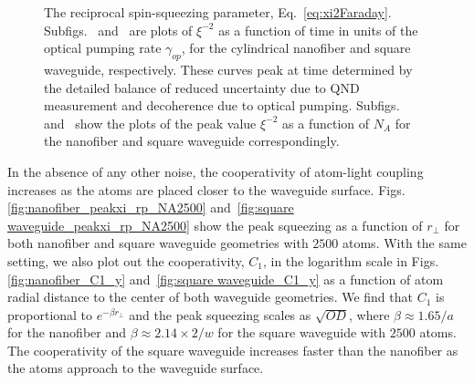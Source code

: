 \documentclass[preprint,aps,pra,onecolumn,superscriptaddress]{revtex4-1} %
\newcommand{\SWG}{square waveguide\xspace}%
\begin{document}
\begin{figure}[htb]
\centering
 \begin{minipage}[h]{0.95\linewidth}
    \hfill
   \end{minipage}\vfill
   \begin{minipage}[h]{0.95\linewidth}
       \hfill
   \end{minipage}
\caption{ The reciprocal spin-squeezing parameter, Eq.~\eqref{eq:xi2Faraday}.  Subfigs.~\protect{} and~\protect{} are plots of $ \xi^{-2} $  as a function of time in units of the optical pumping rate $\gamma_{op}$, for the cylindrical nanofiber and square waveguide, respectively. These curves peak at time determined by the detailed balance of reduced uncertainty due to QND measurement and decoherence due to optical pumping.  Subfigs.~\protect{} and~\protect{} show the plots of the peak value $ \xi^{-2} $ as a function of $ N_A $ for the nanofiber and square waveguide correspondingly. }\label{fig:xi_rpfix_NA_t}
\end{figure}

In the absence of any other noise, the cooperativity of atom-light coupling increases as the atoms are placed closer to the waveguide surface. Figs.\ref{fig:nanofiber_peakxi_rp_NA2500} and~\ref{fig:square waveguide_peakxi_rp_NA2500} show the peak squeezing  as a function of $ r\!_\perp $ for both nanofiber and square waveguide geometries with $2500$ atoms. With the same setting, we also plot out the cooperativity, $ C_1 $, in the logarithm scale in Figs.\ref{fig:nanofiber_C1_y} and~\ref{fig:square waveguide_C1_y} as a function of atom radial distance to the center of both waveguide geometries. We find that $C_1$ is proportional to $ e^{-\beta r\!_\perp} $ and the peak squeezing scales as $ \sqrt{OD} $, where $ \beta \approx 1.65/a $ for the nanofiber and $ \beta \approx 2.14\times 2/w $ for the \SWG with $2500$ atoms. The cooperativity of the \SWG increases faster than the nanofiber as the atoms approach to the waveguide surface. 
\end{document}
